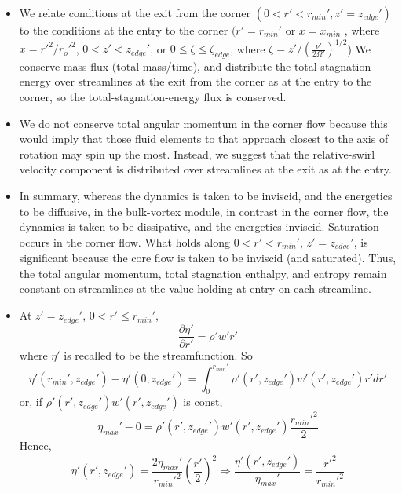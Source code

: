 \documentclass[preprint, prX]{revtex4}
\newcommand{\pfrac}[2]{\left(\frac{#1}{#2}\right)}
\newcommand{\pd}[2]{\frac{\partial#1}{\partial#2}}
\newcommand{\rmin}{r_{min}}
\newcommand{\xmin}{x_{min}}
\newcommand{\zedge}{z_{edge}}
\begin{document}
\begin{itemize}
\item
We relate conditions at the exit from the corner $(0<r'<\rmin', z'=\zedge')$ to the conditions at the entry to the corner $(r'=\rmin'$ or $x=\xmin$ , where $x=r'^2/r_o'^2$,  $0 < z' < \zedge'$, or $0\leq \zeta \leq \zeta_{edge}$, where $\zeta = z'/ \pfrac{\nu'}{2\Omega'}^{1/2}$) We conserve mass flux (total mass/time), and distribute the total stagnation energy over streamlines at the exit from the corner as at the entry to the corner, so the total-stagnation-energy flux is conserved.

\item
We do not conserve total angular momentum in the corner flow because this would imply that those fluid elements to that approach closest to the axis of rotation may spin up the most. Instead, we suggest that the relative-swirl velocity component is distributed over streamlines at the exit as at the entry.

\item
In summary, whereas the dynamics is taken to be inviscid, and the energetics to be diffusive, in the bulk-vortex module, in contrast in the corner flow, the dynamics is taken to be dissipative, and the energetics inviscid. Saturation occurs in the corner flow. What holds along $0 < r'<\rmin'$, $z'=\zedge'$, is significant because the core flow is taken to be inviscid (and saturated). Thus, the total angular momentum, total stagnation enthalpy, and entropy remain constant on streamlines at the value holding at entry on each streamline.

\item
At $z'=\zedge'$, $0<r'\leq \rmin'$,
\begin{equation}
\pd{\eta'}{r'} = \rho' w' r'
\end{equation}
where $\eta'$ is recalled to be the streamfunction. So
\begin{equation}
\eta'(\rmin',\zedge') - \eta'(0,\zedge') = \int_0^{\rmin'} \rho'(r',\zedge') w'(r',\zedge') r'dr'
\end{equation}
or, if $\rho'(r',\zedge')w'(r',\zedge')$ is const,
\begin{equation}
\eta_{max}' - 0 = \rho'(r',\zedge') w'(r',\zedge')\frac{\rmin'^2}{2}
\label{eq:corestreamconst}
\end{equation}
Hence,
\begin{equation}
\eta'(r',\zedge') = \frac{2 \eta_{max}'}{\rmin'^2}\pfrac{r'}{2}^2 \Rightarrow \frac{\eta'(r',\zedge')}{\eta_{max}'} = \frac{r'^2}{\rmin'^2}
\end{equation}


\end{itemize}
\end{document}
